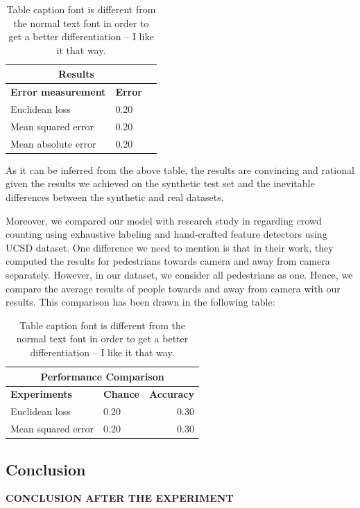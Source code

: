 \begin{table}[H]
\centering
\small\sffamily
\begin{tabular}{llr}
\multicolumn{2}{c}{\textbf{\textbf{Results}}} \\
\bottomrule
\textbf{Error measurement}        & \textbf{Error} \\
\bottomrule
Euclidean loss           & 0.20  \\
Mean squared error       & 0.20  \\
Mean absolute error      & 0.20  \\
\bottomrule
\end{tabular}
\caption{Table caption font is different from the normal text font in order to get a better differentiation -- I like it that way.}
\label{tab:ucsdreal}
\end{table} 

As it can be inferred from the above table, the results are convincing and rational given the results we achieved on the synthetic test set and 
the inevitable differences between the synthetic and real datasets.


\noindent Moreover, we compared our model with \citeauthor*{chan2008privacy} research study in \cite{chan2008privacy} regarding crowd counting using exhaustive labeling and hand-crafted feature detectors using UCSD dataset. One difference we need to mention is that in their work, they computed the results for pedestrians towards camera and away from camera separately. However, in our dataset, we consider all pedestrians as one. Hence, we compare the average results of people towards and away from camera with our results. This comparison has been drawn in the following table:

\begin{table}[H]
\centering
\small\sffamily
\begin{tabular}{llr}
\multicolumn{3}{c}{\textbf{\textbf{Performance Comparison}}} \\
\bottomrule
\textbf{Experiments}  & \textbf{Chance} & \textbf{Accuracy} \\
\bottomrule
Euclidean loss           & 0.20 & 0.30 \\
Mean squared error       & 0.20 & 0.30 \\

\bottomrule
\end{tabular}
\caption{Table caption font is different from the normal text font in order to get a better differentiation -- I like it that way.}
\label{tab:realcomp}
\end{table} 

\subsection{Conclusion}

\textbf{CONCLUSION AFTER THE EXPERIMENT}

